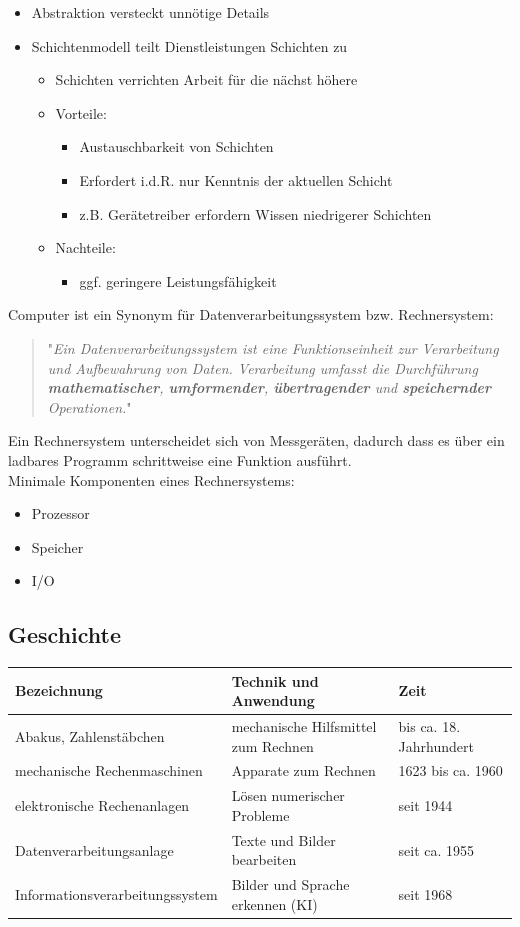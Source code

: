 \documentclass[a4paper,12pt,leqno]{article}
\begin{document}
\begin{itemize}
\item Abstraktion versteckt unnötige Details
\item Schichtenmodell teilt Dienstleistungen Schichten zu
	\begin{itemize}
	\item Schichten verrichten Arbeit für die nächst höhere
	\item Vorteile:
		\begin{itemize}
		\item Austauschbarkeit von Schichten
		\item Erfordert i.d.R. nur Kenntnis der aktuellen Schicht
		\item z.B. Gerätetreiber erfordern Wissen niedrigerer Schichten
		\end{itemize}
	\item Nachteile:
		\begin{itemize}
		\item ggf. geringere Leistungsfähigkeit
		\end{itemize}
	\end{itemize}
\end{itemize}
Computer ist ein Synonym für Datenverarbeitungssystem bzw. Rechnersystem:
\begin{quote}
"\emph{Ein Datenverarbeitungssystem ist eine Funktionseinheit zur
Verarbeitung und Aufbewahrung von Daten. Verarbeitung umfasst die
Durchführung \textbf{mathematischer}, \textbf{umformender}, \textbf{übertragender} und
\textbf{speichernder} Operationen.}"
\end{quote} 
Ein Rechnersystem unterscheidet sich von Messgeräten, dadurch dass es über ein ladbares Programm schrittweise eine Funktion ausführt.\\

Minimale Komponenten eines Rechnersystems:
\begin{itemize}
\item Prozessor
\item Speicher
\item I/O
\end{itemize}

\subsection{Geschichte}
{\small
\begin{tabular}{|l|l|l|}
\hline
Bezeichnung & Technik und Anwendung & Zeit\\
\hline
Abakus, Zahlenstäbchen & mechanische Hilfsmittel zum Rechnen & bis ca. 18. Jahrhundert\\
\hline
mechanische Rechenmaschinen & Apparate zum Rechnen & 1623 bis ca. 1960\\
\hline
elektronische Rechenanlagen & Lösen numerischer Probleme &  seit 1944\\
\hline
Datenverarbeitungsanlage & Texte und Bilder bearbeiten & seit ca. 1955\\
\hline
Informationsverarbeitungssystem & Bilder und Sprache erkennen (KI) & seit 1968\\
\hline 
\end{tabular}
}
\end{document}
